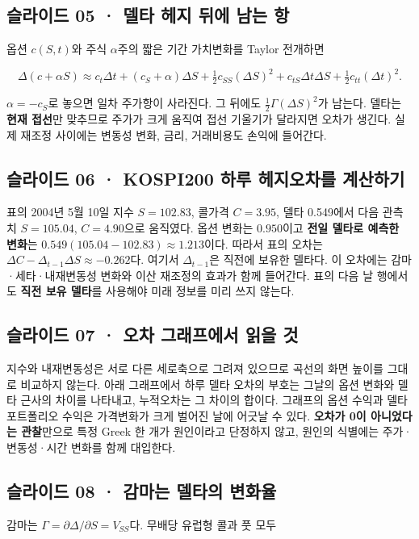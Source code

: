 \documentclass[11pt,a4paper]{article}
\begin{document}
\subsection{슬라이드 05 · 델타 헤지 뒤에 남는 항}
옵션 $c(S,t)$와 주식 $\alpha$주의 짧은 기간 가치변화를 Taylor 전개하면\par

\[
\Delta(c+\alpha S)\approx c_t\Delta t
+(c_S+\alpha)\Delta S
+\tfrac12c_{SS}(\Delta S)^2
+c_{tS}\Delta t\Delta S+\tfrac12c_{tt}(\Delta t)^2.
\]

$\alpha=-c_S$로 놓으면 일차 주가항이 사라진다. 그 뒤에도 $\frac12\Gamma(\Delta S)^2$가 남는다. 델타는 \textbf{현재 접선}만 맞추므로 주가가 크게 움직여 접선 기울기가 달라지면 오차가 생긴다. 실제 재조정 사이에는 변동성 변화, 금리, 거래비용도 손익에 들어간다.\par

\subsection{슬라이드 06 · KOSPI200 하루 헤지오차를 계산하기}
표의 2004년 5월 10일 지수 $S=102.83$, 콜가격 $C=3.95$, 델타 0.549에서 다음 관측치 $S=105.04$, $C=4.90$으로 움직였다. 옵션 변화는 $0.950$이고 \textbf{전일 델타로 예측한 변화}는 $0.549(105.04-102.83)\approx1.213$이다. 따라서 표의 오차는 $\Delta C-\Delta_{t-1}\Delta S\approx-0.262$다. 여기서 $\Delta_{t-1}$은 직전에 보유한 델타다. 이 오차에는 감마·세타·내재변동성 변화와 이산 재조정의 효과가 함께 들어간다. 표의 다음 날 행에서도 \textbf{직전 보유 델타}를 사용해야 미래 정보를 미리 쓰지 않는다.\par

\subsection{슬라이드 07 · 오차 그래프에서 읽을 것}
지수와 내재변동성은 서로 다른 세로축으로 그려져 있으므로 곡선의 화면 높이를 그대로 비교하지 않는다. 아래 그래프에서 하루 델타 오차의 부호는 그날의 옵션 변화와 델타 근사의 차이를 나타내고, 누적오차는 그 차이의 합이다. 그래프의 옵션 수익과 델타 포트폴리오 수익은 가격변화가 크게 벌어진 날에 어긋날 수 있다. \textbf{오차가 0이 아니었다는 관찰}만으로 특정 Greek 한 개가 원인이라고 단정하지 않고, 원인의 식별에는 주가·변동성·시간 변화를 함께 대입한다.\par

\subsection{슬라이드 08 · 감마는 델타의 변화율}
감마는 $\Gamma=\partial\Delta/\partial S=V_{SS}$다. 무배당 유럽형 콜과 풋 모두\par
\end{document}
